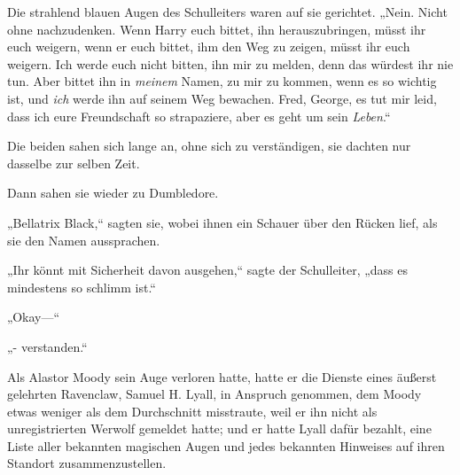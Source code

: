 Die strahlend blauen Augen des Schulleiters waren auf sie gerichtet. „Nein. Nicht ohne nachzudenken. Wenn Harry euch bittet, ihn herauszubringen, müsst ihr euch weigern, wenn er euch bittet, ihm den Weg zu zeigen, müsst ihr euch weigern. Ich werde euch nicht bitten, ihn mir zu melden, denn das würdest ihr nie tun. Aber bittet ihn in \emph{meinem} Namen, zu mir zu kommen, wenn es so wichtig ist, und \emph{ich} werde ihn auf seinem Weg bewachen. Fred, George, es tut mir leid, dass ich eure Freundschaft so strapaziere, aber es geht um sein \emph{Leben}.“

Die beiden sahen sich lange an, ohne sich zu verständigen, sie dachten nur dasselbe zur selben Zeit.

Dann sahen sie wieder zu Dumbledore.

„Bellatrix Black,“ sagten sie, wobei ihnen ein Schauer über den Rücken lief, als sie den Namen aussprachen.

„Ihr könnt mit Sicherheit davon ausgehen,“ sagte der Schulleiter, „dass es mindestens so schlimm ist.“

„Okay—“

„- verstanden.“


Als Alastor Moody sein Auge verloren hatte, hatte er die Dienste eines äußerst gelehrten Ravenclaw, Samuel H. Lyall, in Anspruch genommen, dem Moody etwas weniger als dem Durchschnitt misstraute, weil er ihn nicht als unregistrierten Werwolf gemeldet hatte; und er hatte Lyall dafür bezahlt, eine Liste aller bekannten magischen Augen und jedes bekannten Hinweises auf ihren Standort zusammenzustellen.

